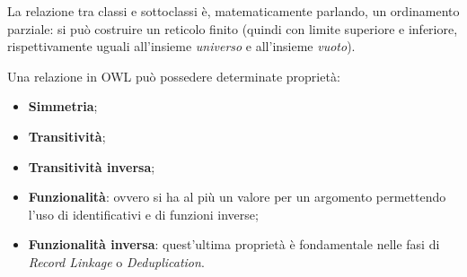 \documentclass[11pt]{article}
\begin{document}
La relazione tra classi e sottoclassi è, matematicamente parlando, un ordinamento parziale: si può costruire un reticolo finito (quindi con limite superiore e inferiore, rispettivamente uguali all'insieme \textit{universo} e all'insieme \textit{vuoto}).

Una relazione in OWL può possedere determinate proprietà:
\begin{itemize}
\item \textbf{Simmetria};
\item \textbf{Transitività};
\item \textbf{Transitività inversa};
\item \textbf{Funzionalità}: ovvero si ha al più un valore per un argomento permettendo l'uso di identificativi e di funzioni inverse;
\item \textbf{Funzionalità inversa}: quest'ultima proprietà è fondamentale nelle fasi di \textit{Record Linkage} o \textit{Deduplication}.
\end{itemize}
\end{document}
